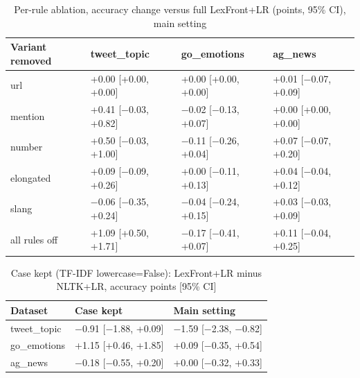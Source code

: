 \documentclass{ieeeaccess}
\begin{document}
\begin{table}[!tb]
\caption{Per-rule ablation, accuracy change versus full LexFront+LR (points, 95\% CI), main setting}\label{tab:6}
\centering
\scriptsize
\setlength{\tabcolsep}{3pt}
\begin{tabular}{llll}
\toprule
\textbf{Variant removed} & \textbf{tweet\_topic} & \textbf{go\_emotions} & \textbf{ag\_news} \\
\midrule
url & +0.00 [+0.00, +0.00] & +0.00 [+0.00, +0.00] & +0.01 [$-$0.07, +0.09] \\
mention & +0.41 [$-$0.03, +0.82] & $-$0.02 [$-$0.13, +0.07] & +0.00 [+0.00, +0.00] \\
number & +0.50 [$-$0.03, +1.00] & $-$0.11 [$-$0.26, +0.04] & +0.07 [$-$0.07, +0.20] \\
elongated & +0.09 [$-$0.09, +0.26] & +0.00 [$-$0.11, +0.13] & +0.04 [$-$0.04, +0.12] \\
slang & $-$0.06 [$-$0.35, +0.24] & $-$0.04 [$-$0.24, +0.15] & +0.03 [$-$0.03, +0.09] \\
all rules off & +1.09 [+0.50, +1.71] & $-$0.17 [$-$0.41, +0.07] & +0.11 [$-$0.04, +0.25] \\
\bottomrule
\end{tabular}
\end{table}

\begin{table}[!t]
\caption{Case kept (TF-IDF lowercase=False): LexFront+LR minus NLTK+LR, accuracy points [95\% CI]}\label{tab:7}
\centering
\footnotesize
\setlength{\tabcolsep}{3pt}
\begin{tabular}{lll}
\toprule
\textbf{Dataset} & \textbf{Case kept} & \textbf{Main setting} \\
\midrule
tweet\_topic & $-$0.91 [$-$1.88, +0.09] & $-$1.59 [$-$2.38, $-$0.82] \\
go\_emotions & +1.15 [+0.46, +1.85] & +0.09 [$-$0.35, +0.54] \\
ag\_news & $-$0.18 [$-$0.55, +0.20] & +0.00 [$-$0.32, +0.33] \\
\bottomrule
\end{tabular}
\end{table}
\end{document}
